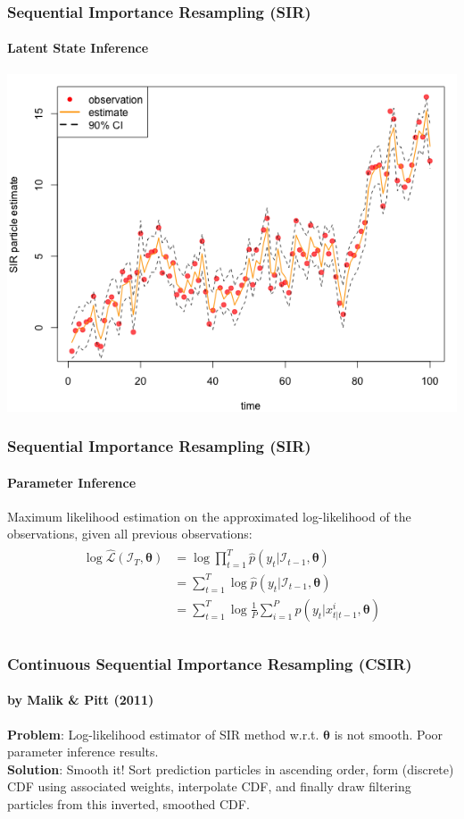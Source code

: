 \documentclass[11pt]{beamer}
\begin{document}
\begin{frame}
\frametitle{Sequential Importance Resampling (SIR)}
\framesubtitle{Latent State Inference}
\centering
\includegraphics[scale=0.45]{ullm-estimate-particle}
\end{frame}

\begin{frame}
\frametitle{Sequential Importance Resampling (SIR)}
\framesubtitle{Parameter Inference}
Maximum likelihood estimation on the approximated log-likelihood of the observations, given all previous observations:
\begin{align*} 
\begin{split}
\log \hat{\mathcal{L}}(\mathcal{I}_T, \boldsymbol{\theta}) &= \log \prod_{t=1}^T \hat{p}(y_t | \mathcal{I}_{t-1}, \boldsymbol{\theta}) \\
&= \sum_{t=1}^T \log \hat{p}(y_t | \mathcal{I}_{t-1}, \boldsymbol{\theta}) \\
&= \sum_{t=1}^T \log \frac{1}{P} \sum_{i=1}^P p(y_t | x_{t | t-1}^i, \boldsymbol{\theta}) \\
\end{split}					
\end{align*} 
\end{frame}

\begin{frame}
\frametitle{Continuous Sequential Importance Resampling (CSIR)}
\framesubtitle{by Malik \& Pitt (2011)}
\textbf{Problem}: Log-likelihood estimator of SIR method w.r.t. $\boldsymbol{\theta}$ is not smooth. Poor parameter inference results.\\
\bigskip
\textbf{Solution}: Smooth it! Sort prediction particles in ascending order, form (discrete) CDF using associated weights, interpolate CDF, and finally draw filtering particles from this inverted, smoothed CDF.
\end{frame}
\end{document}
